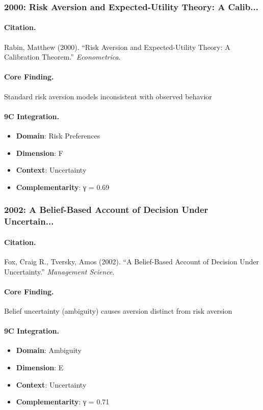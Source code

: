 \subsubsection{2000: Risk Aversion and Expected-Utility Theory: A Calib...}

\paragraph{Citation.}
Rabin, Matthew (2000). ``Risk Aversion and Expected-Utility Theory: A Calibration Theorem.''
\textit{Econometrica}.

\paragraph{Core Finding.}
Standard risk aversion models inconsistent with observed behavior

\paragraph{9C Integration.}
\begin{itemize}[nosep]
  \item \textbf{Domain}: Risk Preferences
  \item \textbf{Dimension}: F
  \item \textbf{Context}: Uncertainty
  \item \textbf{Complementarity}: γ = 0.69
\end{itemize}

\subsubsection{2002: A Belief-Based Account of Decision Under Uncertain...}

\paragraph{Citation.}
Fox, Craig R., Tversky, Amos (2002). ``A Belief-Based Account of Decision Under Uncertainty.''
\textit{Management Science}.

\paragraph{Core Finding.}
Belief uncertainty (ambiguity) causes aversion distinct from risk aversion

\paragraph{9C Integration.}
\begin{itemize}[nosep]
  \item \textbf{Domain}: Ambiguity
  \item \textbf{Dimension}: E
  \item \textbf{Context}: Uncertainty
  \item \textbf{Complementarity}: γ = 0.71
\end{itemize}

